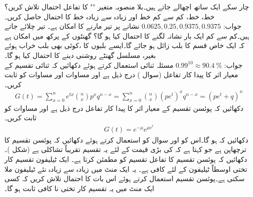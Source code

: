 \quad
چار سکے ایک ساتھ  اچھالے جاتے ہیں۔بلا منصوبہ متغیر "" کا تفاعل احتمال تلاش کریں؟  خط،  خط، کم سے کم  خط اور زیادہ سے زیادہ   خط کا احتمال حاصل کریں۔\\
جواب:\quad
$0.0625, 0.25, 0.9375,0.9375$
\quad
نشانے پر تیر مارنے کا امکان  ہے۔  تیر چلائے جاتے ہیں۔کم سے کم ایک بار نشانہ لگنے کا احتمال کیا ہو گا؟
\quad
{} گھنٹوں کے پرکھ میں  امکان ہے کہ ایک خاص قسم کا بلب زائل ہو جائے گا۔ایسے  بلبوں کا ،کوئی بھی بلب خراب ہوئے بغیر، مسلسل  گھنٹے  روشنی دینے کا احتمال کیا ہو گا۔\\
جواب:\quad
$0.99^{10}\approx \SI{90.4}{\percent}$
\quad
مسئلہ ثنائی استعمال کرتے ہوئے دکھائیں کہ ثنائی تقسیم کے  معیار اثر کا پیدا کار تفاعل (سوال ) درج ذیل ہے اور مساوات  اور مساوات  کو ثابت کریں۔
\begin{align*}
G(t)=\sum_{x=0}^{n}e^{tx}\binom{n}{x}p^xq^{n-x}=\sum_{x=0}^{n}\binom{n}{x}(pe^t)^xq^{n-x}=(pe^t+q)^n
\end{align*}  
\quad
دکھائیں کہ پوئسن تقسیم کے  معیار اثر کا پیدا کار تفاعل  درج ذیل ہے اور مساوات  کو ثابت کریں۔
\begin{align*}
G(t)=e^{-\mu}e^{\mu e^t}
\end{align*}  
\quad
دکھائیں کہ  ہو گا۔اس کو اور سوال  کو استعمال کرتے ہوئے  دکھائیں کہ پوئسن تقسیم کا ترچھاپن  ہے جو کہتا ہے کہ  کی بڑی قیمت کے لئے یہ تقسیم تقریباً تشاکلی ہے (شکل )۔
\quad
دکھائیں کہ پوئسن تقسیم کا تفاعل تقسیم  کو مطمئن کرتا ہے۔
\quad
ایک ٹیلیفون تقسیم کار تختی اوسطاً  ٹیلیفون کے لئے کافی ہے۔ یہ ایک منٹ میں زیادہ سے زیادہ  نئے ٹیلیفون ملا سکتی ہے۔پوئسن تقسیم استعمال کرتے ہوئے اس بات کا احتمال تلاش کریں کہ کسی ایک منٹ میں یہ تقسیم کار تختی نا کافی ثابت ہو گا۔
